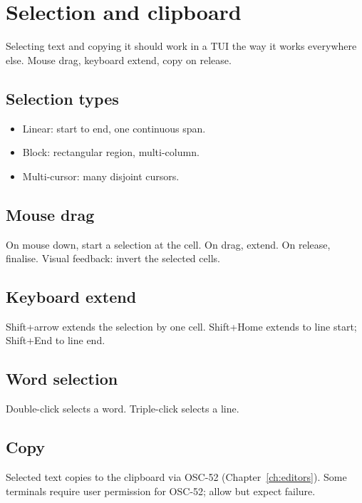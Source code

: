 \chapter{Selection and clipboard}
\label{ch:selection}

\begin{aside}
Selecting text and copying it should work in a TUI the way it
works everywhere else. Mouse drag, keyboard extend, copy on
release.
\end{aside}

\section{Selection types}

\begin{itemize}[leftmargin=*]
  \item Linear: start to end, one continuous span.
  \item Block: rectangular region, multi-column.
  \item Multi-cursor: many disjoint cursors.
\end{itemize}

\section{Mouse drag}

On mouse down, start a selection at the cell. On drag,
extend. On release, finalise. Visual feedback: invert the
selected cells.

\section{Keyboard extend}

Shift+arrow extends the selection by one cell. Shift+Home
extends to line start; Shift+End to line end.

\section{Word selection}

Double-click selects a word. Triple-click selects a line.

\section{Copy}

Selected text copies to the clipboard via OSC-52
(Chapter~\ref{ch:editors}). Some terminals require user
permission for OSC-52; allow but expect failure.

